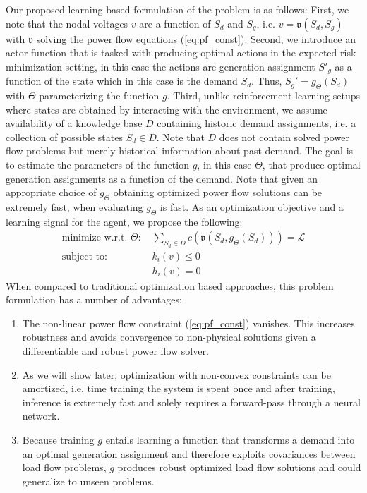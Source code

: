 Our proposed learning based formulation of the problem is as follows: First, we note that the nodal voltages $v$ are a function of $S_d$ and $S_g$, i.e. $v = \mathfrak{v}(S_d,S_g)$ with $\mathfrak{v}$ solving the power flow equations (\ref{eq:pf_const}). Second, we introduce an actor function that is tasked with producing optimal actions in the expected risk minimization setting, in this case the actions are generation assignment $S'_g$ as a function of the state which in this case is the demand $S_d$. Thus, $S_g' = g_\Theta(S_d)$ with $\Theta$ parameterizing the function $g$. Third, unlike reinforcement learning setups where states are obtained by interacting with the environment, we assume availability of a knowledge base $D$ containing historic demand assignments, i.e. a collection of possible states $S_d \in D$. Note that $D$ does not contain solved power flow problems but merely historical information about past demand. The goal is to estimate the parameters of the function $g$, in this case $\Theta$, that produce optimal generation assignments as a function of the demand. Note that given an appropriate choice of $g_\Theta$ obtaining optimized power flow solutions can be extremely fast, when evaluating $g_\Theta$ is fast. As an optimization objective and a learning signal for the agent, we propose the following:
\begin{align}
\text{minimize w.r.t. $\Theta$:\ }& \sum_{S_d \in D} c(\mathfrak{v}(S_d,g_\Theta(S_d))) = \mathcal{L} \label{LOPF_obj}\\
\text{subject to:\ }& k_i(v) \leq 0 \label{const1}\\
 			    & h_i(v) = 0  \label{const2}
\end{align}
When compared to traditional optimization based approaches, this problem formulation has a number of advantages:
\begin{enumerate}
\item The non-linear power flow constraint (\ref{eq:pf_const}) vanishes. This increases robustness and avoids convergence to non-physical solutions given a differentiable and robust power flow solver.
\item As we will show later, optimization with non-convex constraints can be amortized, i.e. time training the system is spent once and after training, inference is extremely fast and solely requires a forward-pass through a neural network.
\item Because training $g$ entails learning a function that transforms a demand into an optimal generation assignment and therefore exploits covariances between load flow problems, $g$ produces robust optimized load flow solutions and could generalize to unseen problems.
\end{enumerate}

